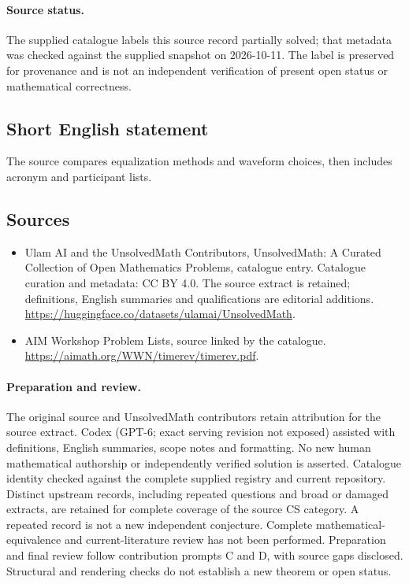 \documentclass[11pt]{article}
\begin{document}
\paragraph{Source status.}
The supplied catalogue labels this source record partially solved; that metadata was checked against the supplied snapshot on 2026-10-11. The label is preserved for provenance and is not an independent verification of present open status or mathematical correctness.
\subsection{Short English statement}
The source compares equalization methods and waveform choices, then includes acronym and participant lists.
\subsection{Sources}
\begin{itemize}
\item[\hypertarget{source:statement:1}{S1}] Ulam AI and the UnsolvedMath Contributors, UnsolvedMath: A Curated Collection of Open Mathematics Problems, catalogue entry. Catalogue curation and metadata: CC BY 4.0. The source extract is retained; definitions, English summaries and qualifications are editorial additions.
\url{https://huggingface.co/datasets/ulamai/UnsolvedMath}.
\item[\hypertarget{source:statement:2}{S2}] AIM Workshop Problem Lists, source linked by the catalogue.
\url{https://aimath.org/WWN/timerev/timerev.pdf}.
\end{itemize}
\paragraph{Preparation and review.}
The original source and UnsolvedMath contributors retain attribution for the source extract. Codex (GPT-6; exact serving revision not exposed) assisted with definitions, English summaries, scope notes and formatting. No new human mathematical authorship or independently verified solution is asserted. Catalogue identity checked against the complete supplied registry and current repository. Distinct upstream records, including repeated questions and broad or damaged extracts, are retained for complete coverage of the source CS category. A repeated record is not a new independent conjecture. Complete mathematical-equivalence and current-literature review has not been performed. Preparation and final review follow contribution prompts C and D, with source gaps disclosed. Structural and rendering checks do not establish a new theorem or open status.
\label{end:statement}
\end{document}
